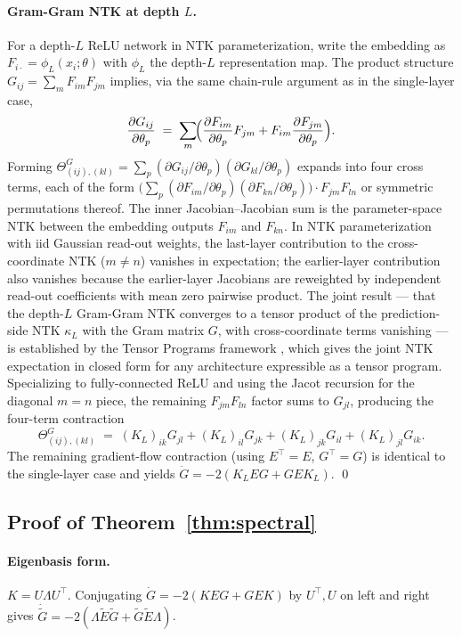 \documentclass{article}
\newcommand{\E}{E}
\newcommand{\Gtilde}{\widetilde{G}}
\newcommand{\Etilde}{\widetilde{\E}}
\begin{document}
\paragraph{Gram-Gram NTK at depth $L$.}
For a depth-$L$ ReLU network in NTK parameterization, write the embedding
as $F_{i\cdot} = \phi_L(x_i; \theta)$ with $\phi_L$ the depth-$L$
representation map. The product structure $G_{ij} = \sum_m F_{im}F_{jm}$
implies, via the same chain-rule argument as in the single-layer case,
\[
\frac{\partial G_{ij}}{\partial \theta_p}
\;=\; \sum_m \!\Bigl(\frac{\partial F_{im}}{\partial \theta_p} F_{jm}
+ F_{im}\frac{\partial F_{jm}}{\partial \theta_p}\Bigr).
\]
Forming $\Theta^G_{(ij),(kl)} = \sum_p (\partial G_{ij}/\partial \theta_p)(\partial G_{kl}/\partial \theta_p)$
expands into four cross terms, each of the form
$\bigl(\sum_p (\partial F_{im}/\partial\theta_p)(\partial F_{kn}/\partial\theta_p)\bigr) \cdot F_{jm}F_{ln}$
or symmetric permutations thereof. The inner Jacobian--Jacobian sum is
the parameter-space NTK between the embedding outputs $F_{im}$ and
$F_{kn}$. In NTK parameterization with iid Gaussian read-out weights,
the last-layer contribution to the cross-coordinate NTK
($m \neq n$) vanishes in expectation; the earlier-layer contribution
also vanishes because the earlier-layer Jacobians are reweighted by
independent read-out coefficients with mean zero pairwise product. The
joint result --- that the depth-$L$ Gram-Gram NTK converges to a tensor
product of the prediction-side NTK $\kappa_L$ with the Gram matrix $G$,
with cross-coordinate terms vanishing --- is established by the Tensor
Programs framework \citep{yang2020tensor}, which gives the joint NTK
expectation in closed form for any architecture expressible as a
tensor program. Specializing to fully-connected ReLU and using the
Jacot recursion \citep{jacot2018neural,lee2019wide} for the diagonal
$m = n$ piece, the remaining $F_{jm}F_{ln}$ factor sums to $G_{jl}$,
producing the four-term contraction
\[
\Theta^G_{(ij),(kl)} \;=\; (K_L)_{ik}G_{jl} + (K_L)_{il}G_{jk}
+ (K_L)_{jk}G_{il} + (K_L)_{jl}G_{ik}.
\]
The remaining gradient-flow contraction (using $\E^\top = \E$, $G^\top = G$)
is identical to the single-layer case and yields
$\dot G = -2(K_L\E G + G\E K_L)$. \qed

\subsection{Proof of Theorem~\ref{thm:spectral}}

\paragraph{Eigenbasis form.}
$K = U\Lambda U^\top$. Conjugating
$\dot G = -2(K\E G + G\E K)$ by $U^\top, U$ on left and right gives
$\dot{\Gtilde} = -2(\Lambda\Etilde\Gtilde + \Gtilde\Etilde\Lambda)$.
\end{document}
